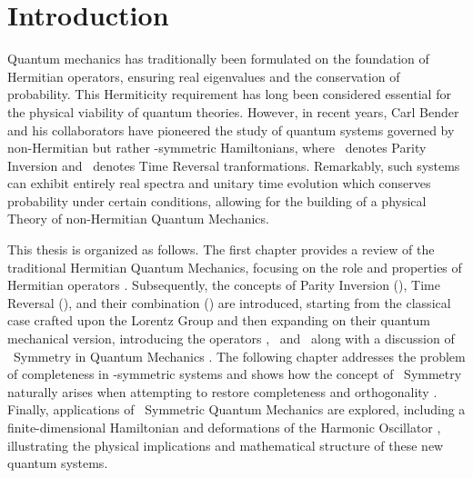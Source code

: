 \chapter{Introduction}\label{ch:introduction}
    Quantum mechanics has traditionally been formulated on the foundation of Hermitian operators, ensuring real eigenvalues and the conservation of probability. This Hermiticity requirement has long been considered essential for the physical viability of quantum theories. However, in recent years, Carl Bender and his collaborators have pioneered the study of quantum systems governed by non-Hermitian but rather \PT-symmetric Hamiltonians, where \mcP\ denotes Parity Inversion and \mcT\ denotes Time Reversal tranformations. Remarkably, such systems can exhibit entirely real spectra and unitary time evolution which conserves probability under certain conditions, allowing for the building of a physical Theory of non-Hermitian Quantum Mechanics.

    This thesis is organized as follows. The first chapter provides a review of the traditional Hermitian Quantum Mechanics, focusing on the role and properties of Hermitian operators \cite{Shankar2012-kg,Sakurai2020-pu,Bernardini1993-iy}. Subsequently, the concepts of Parity Inversion (\mcP), Time Reversal (\mcT), and their combination (\PT) are introduced, starting from the classical case crafted upon the Lorentz Group \cite{bender2024} and then expanding on their quantum mechanical version, introducing the operators \hP, \hT\ and \hPT\ along with a discussion of \PT\ Symmetry in Quantum Mechanics \cite{Bender2005,bender2024}. The following chapter addresses the problem of completeness in \PT-symmetric systems and shows how the concept of \CPT\ Symmetry naturally arises when attempting to restore completeness and orthogonality \cite{Bender2007,bender2024}. Finally, applications of \PT\ Symmetric Quantum Mechanics are explored, including a finite-dimensional Hamiltonian and deformations of the Harmonic Oscillator \cite{Bender1998}, illustrating the physical implications and mathematical structure of these new quantum systems.